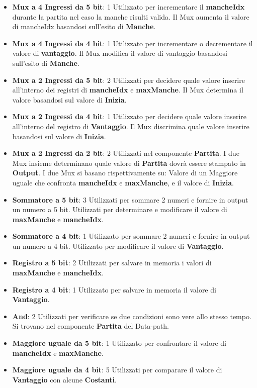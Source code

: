 \documentclass[a4paper]{article}
\begin{document}
\begin{itemize}
	\item \textbf{Mux a 4 Ingressi da 5 bit}: 1
	      Utilizzato per incrementare il \textbf{mancheIdx} durante la partita nel caso la manche risulti valida. Il Mux aumenta il valore di mancheIdx basandosi sull'esito di \textbf{Manche}.
	\item \textbf{Mux a 4 Ingressi da 4 bit}: 1
	      Utilizzato per incrementare o decrementare il valore di \textbf{vantaggio}. Il Mux modifica il valore di vantaggio basandosi sull'esito di \textbf{Manche}.
	\item \textbf{Mux a 2 Ingressi da 5 bit}: 2
	      Utilizzati per decidere quale valore inserire all'interno dei registri di \textbf{mancheIdx} e \textbf{maxManche}. Il Mux determina il valore basandosi sul valore di \textbf{Inizia}.
	\item \textbf{Mux a 2 Ingressi da 4 bit}: 1
	      Utilizzato per decidere quale valore inserire all'interno del registro di \textbf{Vantaggio}. Il Mux discrimina quale valore inserire basandosi sul valore di \textbf{Inizia}.
	\item \textbf{Mux a 2 Ingressi da 2 bit}: 2
	      Utilizzati nel componente \textbf{Partita}. I due Mux insieme determinano quale valore di \textbf{Partita} dovrà essere stampato in \textbf{Output}. I due Mux si basano rispettivamente su: Valore di un Maggiore uguale che confronta \textbf{mancheIdx} e \textbf{maxManche}, e il valore di \textbf{Inizia}.
	\item \textbf{Sommatore a 5 bit}: 3
	      Utilizzati per sommare 2 numeri e fornire in output un numero a 5 bit. Utilizzati per determinare e modificare il valore di \textbf{maxManche} e \textbf{mancheIdx}.
	\item \textbf{Sommatore a 4 bit}: 1
	      Utilizzato per sommare 2 numeri e fornire in output un numero a 4 bit. Utilizzato per modificare il valore di \textbf{Vantaggio}.
	\item \textbf{Registro a 5 bit}: 2
	      Utilizzati per salvare in memoria i valori di \textbf{maxManche} e \textbf{mancheIdx}.
	\item \textbf{Registro a 4 bit}: 1
	      Utilizzato per salvare in memoria il valore di \textbf{Vantaggio}.
	\item \textbf{And}: 2
	      Utilizzati per verificare se due condizioni sono vere allo stesso tempo. Si trovano nel componente \textbf{Partita} del Data-path.
	\item \textbf{Maggiore uguale da 5 bit}: 1
	      Utilizzato per confrontare il valore di \textbf{mancheIdx} e \textbf{maxManche}.
	\item \textbf{Maggiore uguale da 4 bit}: 5
	      Utilizzati per comparare il valore di \textbf{Vantaggio} con alcune \textbf{Costanti}.
\end{itemize}
\end{document}
